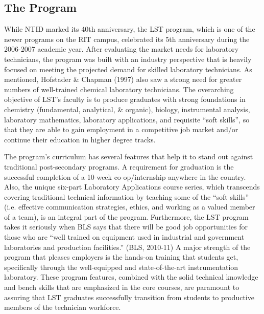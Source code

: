 \documentclass[11.5pt]{sig-alternate} %
\begin{document}
\begin{large}
\subsection*{The Program}
While NTID marked its 40th anniversary, the LST program, which is one of the newer programs on the RIT campus, celebrated its 5th anniversary during the 2006-2007 academic year. After evaluating the market needs for laboratory technicians, the program was built with an industry perspective that is heavily focused on meeting the projected demand for skilled laboratory technicians. As mentioned, Hofstader \& Chapman (1997) also saw a strong need for greater numbers of well-trained chemical laboratory technicians. The overarching objective of LST’s faculty is to produce graduates with strong foundations in chemistry (fundamental, analytical, \& organic), biology, instrumental analysis, laboratory mathematics, laboratory applications, and requisite “soft skills”, so that they are able to gain employment in a competitive job market and/or continue their education in higher degree tracks.

The program’s curriculum has several features that help it to stand out against traditional post-secondary programs. A requirement for graduation is the successful completion of a 10-week co-op/internship anywhere in the country. Also, the unique six-part Laboratory Applications course series, which transcends covering traditional technical information by teaching some of the “soft skills” (i.e. effective communication strategies, ethics, and working as a valued member of a team), is an integral part of the program. Furthermore, the LST program takes it seriously when BLS says that there will be good job opportunities for those who are “well trained on equipment used in industrial and government laboratories and production facilities.” (BLS, 2010-11) A major strength of the program that pleases employers is the hands-on training that students get, specifically through the well-equipped and state-of-the-art instrumentation laboratory. These program features, combined with the solid technical knowledge and bench skills that are emphasized in the core courses, are paramount to assuring that LST graduates successfully transition from students to productive members of the technician workforce.


\end{large}
\end{document}
